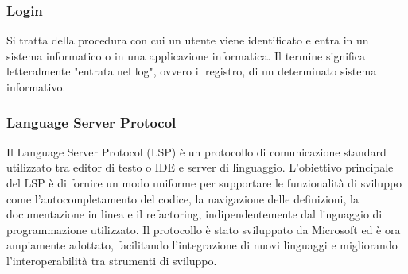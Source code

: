 
\subsubsection*{Login}
Si tratta della procedura con cui un utente viene identificato e entra in un 
sistema informatico o in una applicazione informatica.
Il termine significa letteralmente "entrata nel log", ovvero il registro, di un 
determinato sistema informativo.

\subsubsection*{Language Server Protocol}
Il Language Server Protocol (LSP) è un protocollo di comunicazione standard utilizzato tra editor di testo o IDE e server di linguaggio. 
L'obiettivo principale del LSP è di fornire un modo uniforme per supportare le funzionalità di sviluppo come l'autocompletamento del codice, 
la navigazione delle definizioni, la documentazione in linea e il refactoring, indipendentemente dal linguaggio di programmazione utilizzato. 
Il protocollo è stato sviluppato da Microsoft ed è ora ampiamente adottato, facilitando l'integrazione di nuovi linguaggi e migliorando 
l'interoperabilità tra strumenti di sviluppo.

\newpage
